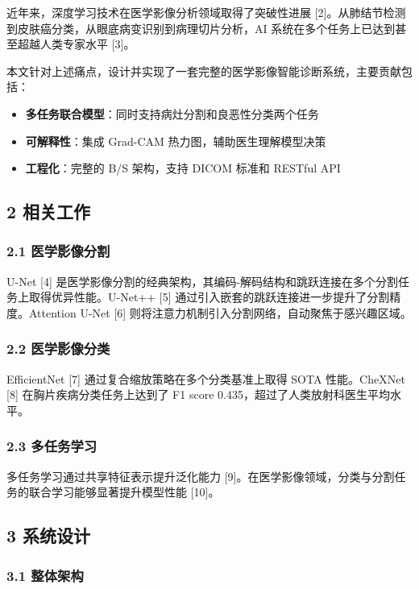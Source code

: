 \documentclass{harryopo-mathnotes}
\begin{document}
近年来，深度学习技术在医学影像分析领域取得了突破性进展 [2]。从肺结节检测到皮肤癌分类，从眼底病变识别到病理切片分析，AI 系统在多个任务上已达到甚至超越人类专家水平 [3]。

本文针对上述痛点，设计并实现了一套完整的医学影像智能诊断系统，主要贡献包括：

\begin{itemize}
  \item \textbf{多任务联合模型}：同时支持病灶分割和良恶性分类两个任务
  \item \textbf{可解释性}：集成 Grad-CAM 热力图，辅助医生理解模型决策
  \item \textbf{工程化}：完整的 B/S 架构，支持 DICOM 标准和 RESTful API
\end{itemize}

\subsection{2 相关工作}

\subsubsection{2.1 医学影像分割}

U-Net [4] 是医学影像分割的经典架构，其编码-解码结构和跳跃连接在多个分割任务上取得优异性能。U-Net++ [5] 通过引入嵌套的跳跃连接进一步提升了分割精度。Attention U-Net [6] 则将注意力机制引入分割网络，自动聚焦于感兴趣区域。

\subsubsection{2.2 医学影像分类}

EfficientNet [7] 通过复合缩放策略在多个分类基准上取得 SOTA 性能。CheXNet [8] 在胸片疾病分类任务上达到了 F1 score 0.435，超过了人类放射科医生平均水平。

\subsubsection{2.3 多任务学习}

多任务学习通过共享特征表示提升泛化能力 [9]。在医学影像领域，分类与分割任务的联合学习能够显著提升模型性能 [10]。

\subsection{3 系统设计}

\subsubsection{3.1 整体架构}
\end{document}
